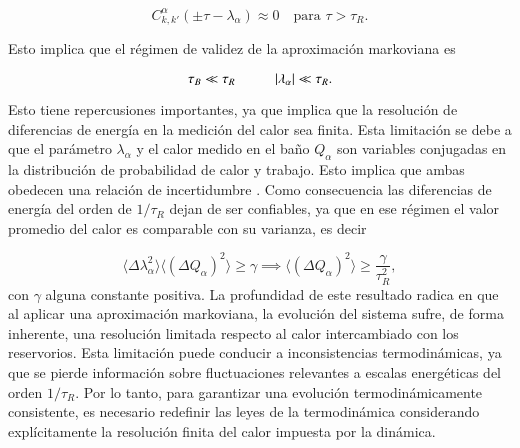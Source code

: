 \begin{equation*}
    C^{\alpha}_{k,k'}(\pm \tau - \lambda_\alpha) \approx 0 \quad \text{para } \tau > \tau_{R}.
\end{equation*}

Esto implica que el régimen de validez de la aproximación markoviana es 

\begin{equation*}
    \tau_{B} \ll \tau_{R} \hspace{10mm} |\lambda_{\alpha}| \ll \tau_{R}.
\end{equation*}

Esto tiene repercusiones importantes, ya que implica que la resolución de diferencias de energía en la medición del calor sea finita. Esta limitación se debe a que el parámetro $\lambda_{\alpha}$ y el calor medido en el baño $Q_{\alpha}$ son variables conjugadas en la distribución de probabilidad de calor y trabajo. Esto implica que ambas obedecen una relación de incertidumbre \cite{folland1997uncertainty}. Como consecuencia las diferencias de energía del orden de $1/\tau_{R}$ dejan de ser confiables, ya que en ese régimen el valor promedio del calor es comparable con su varianza, es decir

\begin{equation*}
    \langle \Delta \lambda^{2}_{\alpha} \rangle \langle (\Delta Q_{\alpha})^{2}\rangle \geq \gamma \implies \langle (\Delta Q_{\alpha})^{2}\rangle  \geq \frac{\gamma}{\tau^{2}_{R}},
\end{equation*}
con $\gamma$ alguna constante positiva. La profundidad de este resultado radica en que al aplicar una aproximación markoviana, la evolución del sistema sufre, de forma inherente, una resolución limitada respecto al calor intercambiado con los reservorios. Esta limitación puede conducir a inconsistencias termodinámicas, ya que se pierde información sobre fluctuaciones relevantes a escalas energéticas del orden $1/\tau_{R}$. Por lo tanto, para garantizar una evolución termodinámicamente consistente, es necesario redefinir las leyes de la termodinámica considerando explícitamente la resolución finita del calor impuesta por la dinámica.

\label{sec2:finiteresol}

